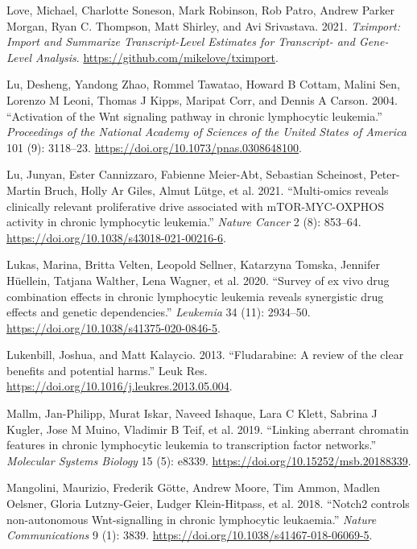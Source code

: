 \documentclass[11pt, a4paper, twosided]{book}
\newenvironment{CSLReferences}%
  {}%
  {\par}
\begin{document}
\begin{CSLReferences}{1}{0}
\leavevmode{}%
Love, Michael, Charlotte Soneson, Mark Robinson, Rob Patro, Andrew Parker Morgan, Ryan C. Thompson, Matt Shirley, and Avi Srivastava. 2021. \emph{Tximport: Import and Summarize Transcript-Level Estimates for Transcript- and Gene-Level Analysis}. \url{https://github.com/mikelove/tximport}.

\leavevmode{}%
Lu, Desheng, Yandong Zhao, Rommel Tawatao, Howard B Cottam, Malini Sen, Lorenzo M Leoni, Thomas J Kipps, Maripat Corr, and Dennis A Carson. 2004. {``{Activation of the Wnt signaling pathway in chronic lymphocytic leukemia}.''} \emph{Proceedings of the National Academy of Sciences of the United States of America} 101 (9): 3118--23. \url{https://doi.org/10.1073/pnas.0308648100}.

\leavevmode{}%
Lu, Junyan, Ester Cannizzaro, Fabienne Meier-Abt, Sebastian Scheinost, Peter-Martin Bruch, Holly Ar Giles, Almut Lütge, et al. 2021. {``{Multi-omics reveals clinically relevant proliferative drive associated with mTOR-MYC-OXPHOS activity in chronic lymphocytic leukemia.}''} \emph{Nature Cancer} 2 (8): 853--64. \url{https://doi.org/10.1038/s43018-021-00216-6}.

\leavevmode{}%
Lukas, Marina, Britta Velten, Leopold Sellner, Katarzyna Tomska, Jennifer Hüellein, Tatjana Walther, Lena Wagner, et al. 2020. {``{Survey of ex vivo drug combination effects in chronic lymphocytic leukemia reveals synergistic drug effects and genetic dependencies}.''} \emph{Leukemia} 34 (11): 2934--50. \url{https://doi.org/10.1038/s41375-020-0846-5}.

\leavevmode{}%
Lukenbill, Joshua, and Matt Kalaycio. 2013. {``{Fludarabine: A review of the clear benefits and potential harms}.''} Leuk Res. \url{https://doi.org/10.1016/j.leukres.2013.05.004}.

\leavevmode{}%
Mallm, Jan-Philipp, Murat Iskar, Naveed Ishaque, Lara C Klett, Sabrina J Kugler, Jose M Muino, Vladimir B Teif, et al. 2019. {``{Linking aberrant chromatin features in chronic lymphocytic leukemia to transcription factor networks.}''} \emph{Molecular Systems Biology} 15 (5): e8339. \url{https://doi.org/10.15252/msb.20188339}.

\leavevmode{}%
Mangolini, Maurizio, Frederik Götte, Andrew Moore, Tim Ammon, Madlen Oelsner, Gloria Lutzny-Geier, Ludger Klein-Hitpass, et al. 2018. {``{Notch2 controls non-autonomous Wnt-signalling in chronic lymphocytic leukaemia}.''} \emph{Nature Communications} 9 (1): 3839. \url{https://doi.org/10.1038/s41467-018-06069-5}.


\end{CSLReferences}
\end{document}
